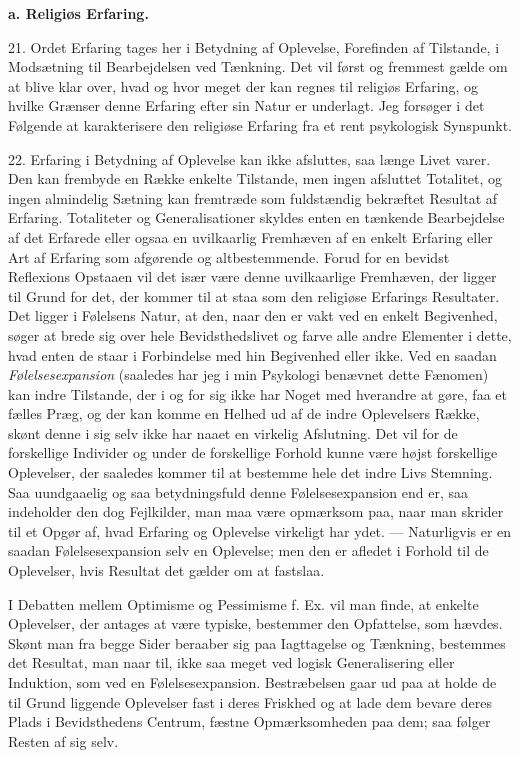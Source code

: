 \documentclass[12pt,a4paper,openany]{book}
\newcommand{\opage}[1]{\marginnote{\footnotesize\textit{[#1]}}}
\begin{document}
\begin{center}\textbf{a. Religiøs Erfaring.}\end{center}

21. Ordet Erfaring tages her i Betydning af Oplevelse, Forefinden af
Tilstande, i Modsætning til Bearbejdelsen ved Tænkning. Det vil først og
fremmest gælde om at blive klar over, hvad og hvor meget der kan regnes
til religiøs Erfaring, og hvilke Grænser denne Erfaring efter sin Natur
er underlagt. Jeg forsøger i det Følgende at karakterisere den religiøse
Erfaring fra et rent psykologisk Synspunkt.

22. Erfaring i Betydning af Oplevelse kan ikke afsluttes, saa længe
Livet varer. Den kan frembyde en Række enkelte Tilstande, men ingen
afsluttet Totalitet, og ingen almindelig Sætning kan fremtræde som
fuldstændig bekræftet Resultat af Erfaring. Totaliteter og
Generalisationer skyldes enten en tænkende Bearbejdelse af det Erfarede
eller ogsaa en uvilkaarlig Fremhæven af en enkelt Erfaring eller Art af
Erfaring som afgørende og altbestemmende. Forud for en bevidst
Reflexions Opstaaen vil det især være denne uvilkaarlige Fremhæven, der
ligger til Grund for det, der kommer til at staa som den religiøse
Erfarings Resultater. Det ligger i Følelsens Natur, at den, naar den er
vakt ved en enkelt Begivenhed, søger at brede sig over hele
Bevidsthedslivet og farve alle andre Elementer i dette, hvad enten de
staar i Forbindelse med hin Begivenhed eller ikke. Ved en saadan
\textit{Følelsesexpansion} (saaledes har jeg i min Psykologi benævnet
dette Fænomen) kan indre Tilstande, der i og for sig ikke har Noget med
hverandre at gøre, faa et fælles Præg, og der kan komme en Helhed ud af
de indre Oplevelsers Række, skønt denne i sig selv ikke har naaet en
virkelig Afslutning. Det vil for de forskellige Individer og under de
forskellige Forhold kunne være højst forskellige Oplevelser, der
saaledes kommer til at bestemme hele
\opage{56}det indre Livs Stemning. Saa uundgaaelig og saa betydningsfuld
denne Følelsesexpansion end er, saa indeholder den dog Fejlkilder, man
maa være opmærksom paa, naar man skrider til et Opgør af, hvad Erfaring
og Oplevelse virkeligt har ydet. --- Naturligvis er en saadan
Følelsesexpansion selv en Oplevelse; men den er afledet i Forhold til de
Oplevelser, hvis Resultat det gælder om at fastslaa.

I Debatten mellem Optimisme og Pessimisme f. Ex. vil man finde, at
enkelte Oplevelser, der antages at være typiske, bestemmer den
Opfattelse, som hævdes. Skønt man fra begge Sider beraaber sig paa
Iagttagelse og Tænkning, bestemmes det Resultat, man naar til, ikke saa
meget ved logisk Generalisering eller Induktion, som ved en
Følelsesexpansion. Bestræbelsen gaar ud paa at holde de til Grund
liggende Oplevelser fast i deres Friskhed og at lade dem bevare deres
Plads i Bevidsthedens Centrum, fæstne Opmærksomheden paa dem; saa følger
Resten af sig selv.
\end{document}

